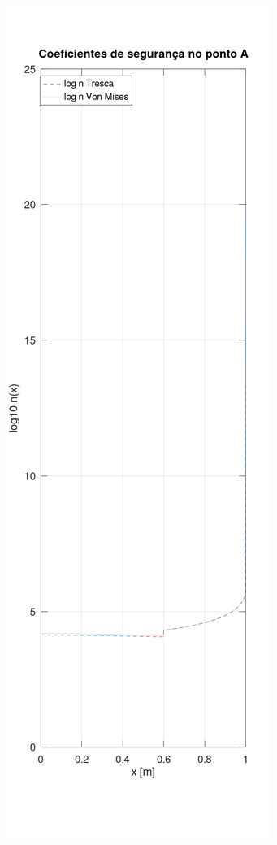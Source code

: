 \documentclass[10pt]{article}
\begin{document}
\begin{center}
    \includegraphics[scale=0.25]{figure17.png}

\end{center}
\end{document}
